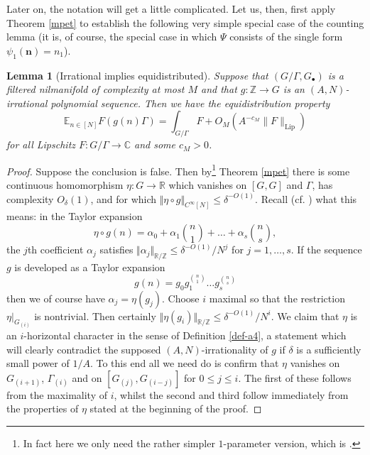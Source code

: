 \documentclass[11pt,reqno]{amsart}
\numberwithin{equation}{section}
\theoremstyle{plain}
\newtheorem{lemma}[subsection]{Lemma}
\theoremstyle{definition}
\renewcommand{\leq}{\leqslant}
\newcommand\E{{\mathbb{E}}}
\newcommand\Z{\mathbb{Z}}
\newcommand\R{\mathbb{R}}
\newcommand\C{\mathbb{C}}
\newcommand\1{{\bf 1}}
\newcommand\2{{\bf 2}}
\begin{document}
Later on, the notation will get a little complicated. Let us, then, first apply Theorem \ref{mpet} to establish the following very simple special case of the counting lemma (it is, of course, the special case in which $\Psi$ consists of the single form $\psi_1(\textbf{n}) = n_1$).

\begin{lemma}[Irrational implies equidistributed]\label{irrat-equi}
Suppose that $(G/\Gamma, G_{\bullet})$ is a filtered nilmanifold of complexity at most $M$ and that $g : \Z \rightarrow G$ is an $(A,N)$-irrational polynomial sequence. Then we have the equidistribution property
$$ \E_{n \in [N]} F(g(n)\Gamma) = \int_{G/\Gamma} F + O_M( A^{-c_M} \|F\|_{\operatorname{Lip}} )$$
for all Lipschitz $F: G/\Gamma \to \C$ and some $c_M > 0$.
\end{lemma}

\begin{proof} Suppose the conclusion is false. Then by\footnote{In fact here we only need the rather simpler $1$-parameter version, which is \cite[Theorem 1.16]{green-tao-nilratner}.} Theorem \ref{mpet} there is some continuous homomorphism $\eta : G \rightarrow \R$ which vanishes on $[G,G]$ and $\Gamma$, has complexity $O_{\delta}(1)$, and for which $\Vert \eta \circ g \Vert_{C^{\infty}[N]} \leq \delta^{-O(1)}$. Recall (cf. \cite[Definition 2.7]{green-tao-nilratner}) what this means: in the Taylor expansion 
\[ \textstyle\eta \circ g(n) = \alpha_0 + \alpha_1 \binom{n}{1} + \dots + \alpha_s \binom{n}{s},\] the $j$th coefficient $\alpha_j$ satisfies $\Vert \alpha_j\Vert_{\R/\Z} \leq \delta^{-O(1)}/N^j$ for $j = 1,\dots, s$. If the sequence $g$ is developed as a Taylor expansion
\[ g(n) = g_0 g_1^{\binom{n}{1}} \dots g_s^{\binom{n}{s}}\] then we of course have $\alpha_j = \eta(g_j)$.
Choose $i$ maximal so that the restriction $\eta|_{G_{(i)}}$ is nontrivial. Then certainly $\Vert \eta(g_i) \Vert_{\R/\Z} \leq \delta^{-O(1)}/N^i$. We claim that $\eta$ is an $i$-horizontal character in the sense of Definition \ref{def-a4}, a statement which will clearly contradict the supposed $(A,N)$-irrationality of $g$ if $\delta$ is a sufficiently small power of $1/A$. To this end all we need do is confirm that $\eta$ vanishes on $G_{(i+1)}$, $\Gamma_{(i)}$ and on $[G_{(j)}, G_{(i-j)}]$ for $0 \leq j \leq i$. The first of these follows from the maximality of $i$, whilst the second and third follow immediately from the properties of $\eta$ stated at the beginning of the proof.\end{proof}
\end{document}
